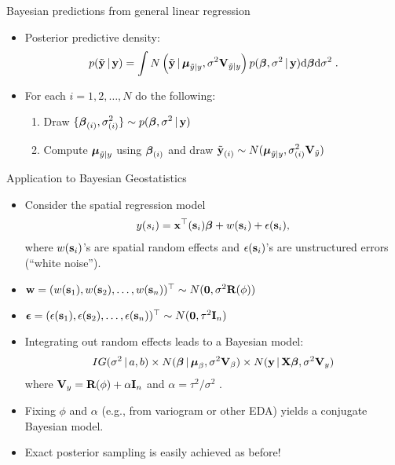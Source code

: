 \begin{frame}{Bayesian predictions from general linear regression}
\begin{itemize}
\item Posterior predictive density:
\[
 p(\tilde{\textbf{y}}\,|\, \textbf{y}) = \int N\left(\tilde{\textbf{y}}\,|\, \mbox{\boldmath $\mu$}_{\tilde{y}|y}, \sigma^2 \textbf{V}_{\tilde{y}|y}\right) p(\mbox{\boldmath $ \beta $}, \sigma^2\,|\, \textbf{y}) \mbox{d}\mbox{\boldmath $ \beta $} \mbox{d}\sigma^2\; .
\]

\item For each $i=1,2,\ldots,N$ do the following: 
 \begin{enumerate}\setlength{\itemsep}{0.25cm}
  \item Draw $\displaystyle \{\mbox{\boldmath $ \beta $}_{(i)},\sigma^2_{(i)}\} \sim p(\mbox{\boldmath $ \beta $},\sigma^2\,|\, \textbf{y})$
  \item Compute $\mbox{\boldmath $\mu$}_{\tilde{y}|y}$ using $\mbox{\boldmath $ \beta $}_{(i)}$ and draw $\displaystyle \tilde{\textbf{y}}_{(i)} \sim N(\mbox{\boldmath $\mu$}_{\tilde{y}|y}, \sigma^2_{(i)} \textbf{V}_{\tilde{y}})$
 \end{enumerate}
 \end{itemize}

\end{frame}


\begin{frame}{Application to Bayesian Geostatistics}
 
 \begin{itemize}\setlength{\itemsep}{0.1cm}  
  \item Consider the spatial regression model
  \begin{align*}
   y(s_i) = \textbf{x}^{\top}(\textbf{s}_i)\mbox{\boldmath $ \beta $} + w(\textbf{s}_i) + \epsilon(\textbf{s}_i),
  \end{align*}
  where $w(\textbf{s}_i)$'s are spatial random effects and $\epsilon(\textbf{s}_i)$'s are unstructured errors (``white noise'').
  
  \item $\textbf{w} = (w(\textbf{s}_1), w(\textbf{s}_2), \ldots, w(\textbf{s}_n))^{\top} \sim N(\textbf{0}, \sigma^2 \textbf{R}(\phi))$
  
  \item $\mbox{\boldmath $\epsilon$} = (\epsilon(\textbf{s}_1), \epsilon(\textbf{s}_2), \ldots, \epsilon(\textbf{s}_n))^{\top} \sim N(\textbf{0}, \tau^2 \textbf{I}_n)$
  
  \item Integrating out random effects leads to a Bayesian model:
  \[
    IG(\sigma^2\,|\, a, b) \times N(\mbox{\boldmath $ \beta $} \,|\, \mbox{\boldmath $\mu$}_{\beta}, \sigma^2\textbf{V}_{\beta}) \times N(\textbf{y}\,|\, \textbf{X}\mbox{\boldmath $ \beta $}, \sigma^2 \textbf{V}_y)
  \]
  where $\textbf{V}_{y} = \textbf{R}(\phi) + \alpha \textbf{I}_n$ and $\alpha = \tau^2/\sigma^2$\; .
  
  \item Fixing $\phi$ and $\alpha$ (e.g., from variogram or other EDA) yields a conjugate Bayesian model.
  
  \item Exact posterior sampling is easily achieved as before!
 \end{itemize}

\end{frame}

